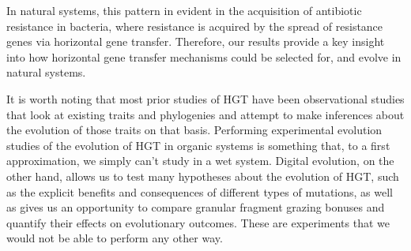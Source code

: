 \documentclass[PhD]{msu-thesis}
\begin{document}
In natural systems, this pattern in evident in the acquisition of antibiotic resistance in bacteria, where resistance is acquired by the spread of resistance genes via horizontal gene transfer. Therefore, our results provide a key insight into how horizontal gene transfer mechanisms could be selected for, and evolve in natural systems.

It is worth noting that most prior studies of HGT have been observational studies that look at existing traits and phylogenies and attempt to make inferences about the evolution of those traits on that basis. Performing experimental evolution studies of the evolution of HGT in organic systems is something that, to a first approximation, we simply can't study in a wet system. Digital evolution, on the other hand, allows us to test many hypotheses about the evolution of HGT, such as the explicit benefits and consequences of different types of mutations, as well as gives us an opportunity to compare granular fragment grazing bonuses and quantify their effects on evolutionary outcomes. These are experiments that we would not be able to perform any other way.   

\end{document}
